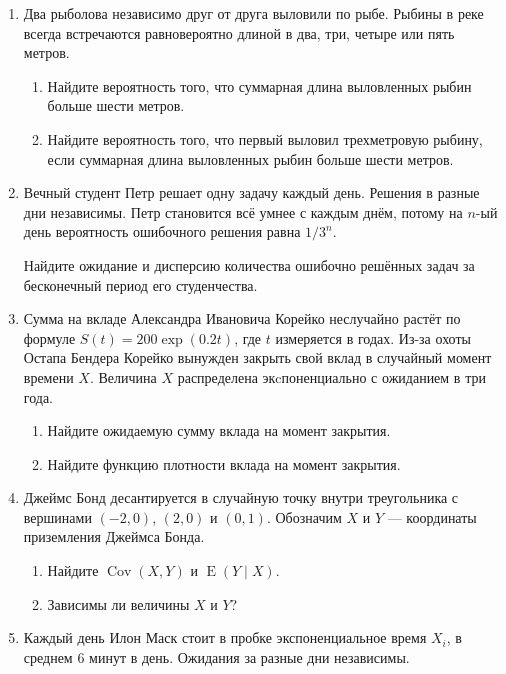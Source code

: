 \documentclass[12pt]{article}
\DeclareMathOperator{\Cov}{Cov}
\DeclareMathOperator{\E}{E}
\begin{document}
\begin{enumerate}
  \item Два рыболова независимо друг от друга выловили по рыбе. 
  Рыбины в реке всегда встречаются равновероятно длиной в два, три, четыре или пять метров.  

  \begin{enumerate}
    \item Найдите вероятность того, что суммарная длина выловленных рыбин больше шести метров.
    \item Найдите вероятность того, что первый выловил трехметровую рыбину, если суммарная длина выловленных рыбин больше шести метров.
  \end{enumerate}

  \item Вечный студент Петр решает одну задачу каждый день. Решения в разные дни независимы. 
  Петр становится всё умнее с каждым днём, потому на $n$-ый день вероятность ошибочного решения равна $1/3^n$. 
  

  Найдите ожидание и дисперсию количества ошибочно решённых задач за бесконечный период его студенчества. 

  \item Сумма на вкладе Александра Ивановича Корейко неслучайно растёт по формуле $S(t) = 200\exp(0.2t)$, где $t$ измеряется в годах. 
  Из-за охоты Остапа Бендера Корейко вынужден закрыть свой вклад в случайный момент времени $X$. 
  Величина $X$ распределена экcпоненциально с ожиданием в три года.

  \begin{enumerate}
    \item Найдите ожидаемую сумму вклада на момент закрытия. 
    \item Найдите функцию плотности вклада на момент закрытия. 
  \end{enumerate}

  \item Джеймс Бонд десантируется в случайную точку внутри треугольника с вершинами $(-2, 0)$, $(2, 0)$
  и $(0, 1)$. Обозначим $X$ и $Y$ — координаты приземления Джеймса Бонда. 

  \begin{enumerate}
    \item Найдите $\Cov(X, Y)$ и $\E(Y \mid X)$.
    \item Зависимы ли величины $X$ и $Y$?
  \end{enumerate}

  \item Каждый день Илон Маск стоит в пробке экспоненциальное время $X_i$, в среднем 6 минут в день. 
  Ожидания за разные дни независимы. 


\end{enumerate}
\end{document}
